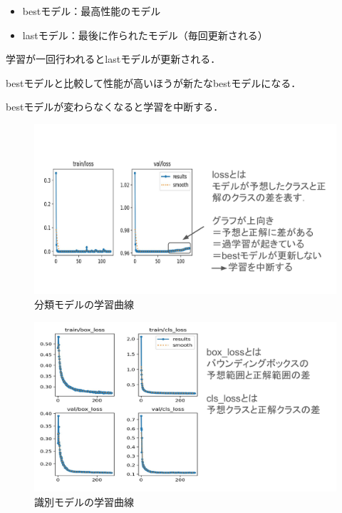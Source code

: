 
\begin{itemize}
	\item bestモデル：最高性能のモデル
	\item lastモデル：最後に作られたモデル（毎回更新される）
\end{itemize}

学習が一回行われるとlastモデルが更新される．

bestモデルと比較して性能が高いほうが新たなbestモデルになる．

bestモデルが変わらなくなると学習を中断する．



\newpage



\begin{figure}
	\centering
	\includegraphics[width=0.8\linewidth]{fig/results_cls}
	\caption[分類モデルの学習曲線]{分類モデルの学習曲線}
	\label{fig:resultscls}
\end{figure}

\newpage

\begin{figure}
	\centering
	\includegraphics[width=0.8\linewidth]{fig/results_det}
	\caption[識別モデルの学習曲線]{識別モデルの学習曲線}
	\label{fig:resultsdet}
\end{figure}


